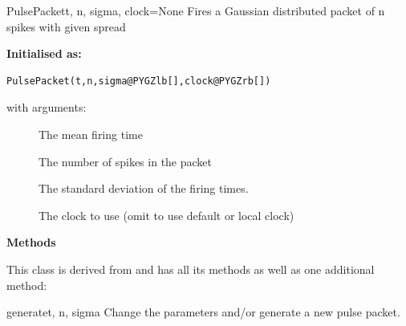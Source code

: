 \documentclass[letterpaper,10pt,english]{manual}
\begin{document}
\hypertarget{brian.PulsePacket}{}\begin{classdesc}{PulsePacket}{t, n, sigma, clock=None}
Fires a Gaussian distributed packet of n spikes with given spread

\textbf{Initialised as:}

\begin{Verbatim}[commandchars=@\[\]]
PulsePacket(t,n,sigma@PYGZlb[],clock@PYGZrb[])
\end{Verbatim}

with arguments:
\begin{description}
\item[]
The mean firing time

\item[]
The number of spikes in the packet

\item[]
The standard deviation of the firing times.

\item[]
The clock to use (omit to use default or local clock)

\end{description}

\textbf{Methods}

This class is derived from \hyperlink{brian.SpikeGeneratorGroup}{} and has all its
methods as well as one additional method:

\hypertarget{brian.PulsePacket.generate}{}\begin{methoddesc}{generate}{t, n, sigma}
Change the parameters and/or generate a new pulse packet.
\end{methoddesc}
\end{classdesc}
\end{document}

